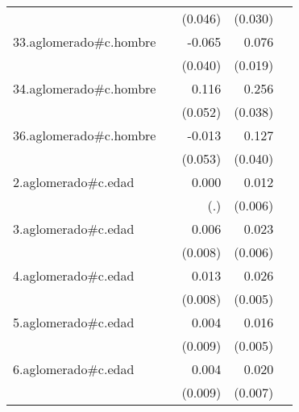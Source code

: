 {\begin{longtable}{l*{4}{D{.}{.}{-1}}}
            &                     &     (0.046)         &     (0.030)         &                     \\
\addlinespace
33.aglomerado#c.hombre&                     &      -0.065         &       0.076\sym{***}&                     \\
            &                     &     (0.040)         &     (0.019)         &                     \\
\addlinespace
34.aglomerado#c.hombre&                     &       0.116\sym{*}  &       0.256\sym{***}&                     \\
            &                     &     (0.052)         &     (0.038)         &                     \\
\addlinespace
36.aglomerado#c.hombre&                     &      -0.013         &       0.127\sym{**} &                     \\
            &                     &     (0.053)         &     (0.040)         &                     \\
\addlinespace
2.aglomerado#c.edad&                     &       0.000         &       0.012\sym{*}  &                     \\
            &                     &         (.)         &     (0.006)         &                     \\
\addlinespace
3.aglomerado#c.edad&                     &       0.006         &       0.023\sym{***}&                     \\
            &                     &     (0.008)         &     (0.006)         &                     \\
\addlinespace
4.aglomerado#c.edad&                     &       0.013         &       0.026\sym{***}&                     \\
            &                     &     (0.008)         &     (0.005)         &                     \\
\addlinespace
5.aglomerado#c.edad&                     &       0.004         &       0.016\sym{**} &                     \\
            &                     &     (0.009)         &     (0.005)         &                     \\
\addlinespace
6.aglomerado#c.edad&                     &       0.004         &       0.020\sym{**} &                     \\
            &                     &     (0.009)         &     (0.007)         &                     \\

\end{longtable}}
